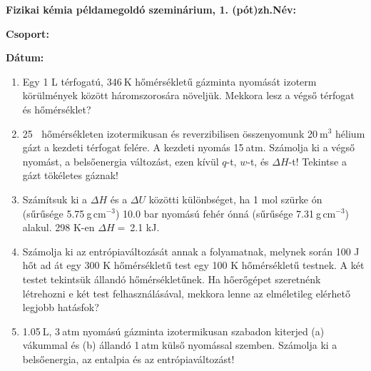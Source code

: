 \documentclass[a4paper, 11pt]{article}
\begin{document}
\textbf{Fizikai kémia példamegoldó szeminárium, 1. (pót)zh.}\hfill \textbf{Név:}

\hfill \textbf{Csoport:}

\hfill \textbf{Dátum:}

\thispagestyle{empty}

\begin{enumerate}

\item Egy 1 L térfogatú, 346$~$K hőmérsékletű gázminta nyomását izoterm körülmények között háromszorosára növeljük. Mekkora lesz a végső térfogat és hőmérséklet?

\item 25 \celsius$~$ hőmérsékleten izotermikusan és reverzibilisen összenyomunk 20$~$m$^3$ hélium gázt a kezdeti térfogat felére. A kezdeti nyomás 15$~$atm. Számolja ki a végső nyomást, a belsőenergia változást, ezen kívül $q$-t, $w$-t, és $\Delta H$-t! Tekintse a gázt tökéletes gáznak!

\item Számítsuk ki a $\Delta H$ és a $\Delta U$ közötti különbséget, ha 1 mol szürke ón (sűrűsége 5.75$~$g$\,$cm$^{-3}$) 10.0 bar nyomású fehér ónná (sűrűsége 7.31$~$g$\,$cm$^{-3}$) alakul. 298 K-en $\Delta H=~$2.1 kJ.

\item Számolja ki az entrópiaváltozását annak a folyamatnak, melynek során 100 J hőt ad át egy 300 K hőmérsékletű test egy 100 K hőmérsékletű testnek. A két testet tekintsük állandó hőmérsékletűnek. Ha hőerőgépet szeretnénk létrehozni e két test felhasználásával, mekkora lenne az elméletileg elérhető legjobb hatásfok?

\item 1.05$~$L, 3$~$atm nyomású gázminta izotermikusan szabadon kiterjed (a) vákummal és (b) állandó 1$~$atm külső nyomással szemben. Számolja ki a belsőenergia, az entalpia és az entrópiaváltozást!

\end{enumerate}
\end{document}
